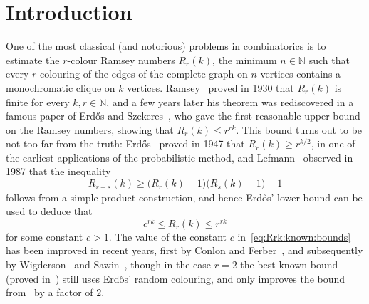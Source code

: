 \documentclass[12pt,reqno]{amsart}
\theoremstyle{definition}
\theoremstyle{remark}
\newcommand\N{\mathbb{N}}
\renewcommand{\le}{\leqslant}
\renewcommand{\ge}{\geqslant}
\def\N{\mathbb{N}}
\begin{document}
\maketitle

\section{Introduction}

One of the most classical (and notorious) problems in combinatorics is to estimate the \(r\)-colour Ramsey numbers \(R_r(k)\), the minimum \(n \in \N\) such that every \(r\)-colouring of the edges of the complete graph on \(n\) vertices contains a monochromatic clique on \(k\) vertices. Ramsey~\cite{R30} proved in 1930 that \(R_r(k)\) is finite for every \(k,r \in \N\), and a few years later his theorem was rediscovered in a famous paper of Erd\H{o}s and Szekeres~\cite{ESz35}, who gave the first reasonable upper bound on the Ramsey numbers, showing that \(R_r(k) \le r^{rk}\).
This bound turns out to be not too far from the truth: Erd\H{o}s~\cite{E47} proved in 1947 that \(R_r(k) \ge r^{k/2}\), in one of the earliest applications of the probabilistic method, and Lefmann~\cite{L87} observed in 1987 that the inequality
%
\begin{equation*}
	R_{r+s}(k) \ge \big( R_r(k) - 1 \big) \big( R_s(k) - 1 \big) + 1
\end{equation*}
%
follows from a simple product construction, and hence Erd\H{o}s' lower bound can be used to deduce that
%
\begin{equation}
	\label{eq:Rrk:known:bounds}
	c^{rk} \le R_r(k) \le r^{rk}
\end{equation}
%
for some constant \(c > 1\). The value of the constant \(c\) in~\eqref{eq:Rrk:known:bounds} has been improved in recent years, first by Conlon and Ferber~\cite{CF}, and subsequently by Wigderson~\cite{W} and Sawin~\cite{S}, though in the case \(r = 2\) the best known bound (proved in~\cite{S77}) still uses Erd\H{o}s' random colouring, and only improves the bound from~\cite{E47} by a factor of \(2\).
\end{document}
